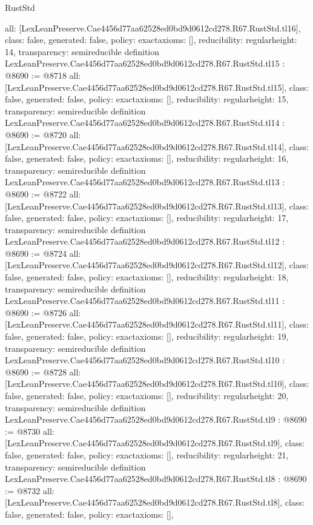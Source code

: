 \begin{lexlean}{RustStd}
\begin{coremodule}
{  all: [LexLeanPreserve.Cae4456d77aa62528ed0bd9d0612cd278.R67.RustStd.tl16],
  class: false,
  generated: false,
  policy: exact{axioms: []},
  reducibility: regular{height: 14},
  transparency: semireducible
}
definition LexLeanPreserve.Cae4456d77aa62528ed0bd9d0612cd278.R67.RustStd.tl15 : @8690 := @8718 {
  all: [LexLeanPreserve.Cae4456d77aa62528ed0bd9d0612cd278.R67.RustStd.tl15],
  class: false,
  generated: false,
  policy: exact{axioms: []},
  reducibility: regular{height: 15},
  transparency: semireducible
}
definition LexLeanPreserve.Cae4456d77aa62528ed0bd9d0612cd278.R67.RustStd.tl14 : @8690 := @8720 {
  all: [LexLeanPreserve.Cae4456d77aa62528ed0bd9d0612cd278.R67.RustStd.tl14],
  class: false,
  generated: false,
  policy: exact{axioms: []},
  reducibility: regular{height: 16},
  transparency: semireducible
}
definition LexLeanPreserve.Cae4456d77aa62528ed0bd9d0612cd278.R67.RustStd.tl13 : @8690 := @8722 {
  all: [LexLeanPreserve.Cae4456d77aa62528ed0bd9d0612cd278.R67.RustStd.tl13],
  class: false,
  generated: false,
  policy: exact{axioms: []},
  reducibility: regular{height: 17},
  transparency: semireducible
}
definition LexLeanPreserve.Cae4456d77aa62528ed0bd9d0612cd278.R67.RustStd.tl12 : @8690 := @8724 {
  all: [LexLeanPreserve.Cae4456d77aa62528ed0bd9d0612cd278.R67.RustStd.tl12],
  class: false,
  generated: false,
  policy: exact{axioms: []},
  reducibility: regular{height: 18},
  transparency: semireducible
}
definition LexLeanPreserve.Cae4456d77aa62528ed0bd9d0612cd278.R67.RustStd.tl11 : @8690 := @8726 {
  all: [LexLeanPreserve.Cae4456d77aa62528ed0bd9d0612cd278.R67.RustStd.tl11],
  class: false,
  generated: false,
  policy: exact{axioms: []},
  reducibility: regular{height: 19},
  transparency: semireducible
}
definition LexLeanPreserve.Cae4456d77aa62528ed0bd9d0612cd278.R67.RustStd.tl10 : @8690 := @8728 {
  all: [LexLeanPreserve.Cae4456d77aa62528ed0bd9d0612cd278.R67.RustStd.tl10],
  class: false,
  generated: false,
  policy: exact{axioms: []},
  reducibility: regular{height: 20},
  transparency: semireducible
}
definition LexLeanPreserve.Cae4456d77aa62528ed0bd9d0612cd278.R67.RustStd.tl9 : @8690 := @8730 {
  all: [LexLeanPreserve.Cae4456d77aa62528ed0bd9d0612cd278.R67.RustStd.tl9],
  class: false,
  generated: false,
  policy: exact{axioms: []},
  reducibility: regular{height: 21},
  transparency: semireducible
}
definition LexLeanPreserve.Cae4456d77aa62528ed0bd9d0612cd278.R67.RustStd.tl8 : @8690 := @8732 {
  all: [LexLeanPreserve.Cae4456d77aa62528ed0bd9d0612cd278.R67.RustStd.tl8],
  class: false,
  generated: false,
  policy: exact{axioms: []},
}
\end{coremodule}
\end{lexlean}
